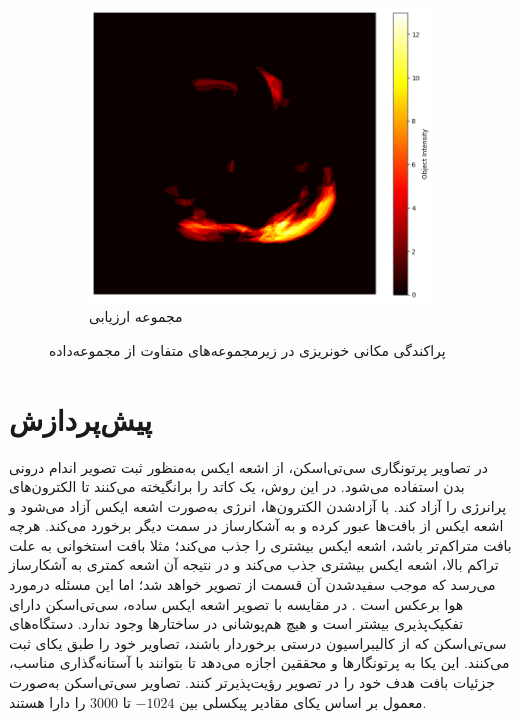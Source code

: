 \begin{figure}[h!]
    \begin{subfigure}{0.33\textwidth}
        \includegraphics[width=\linewidth]{Images/chapter2/test_heatmap.png}
        \caption{مجموعه ارزیابی}
        \label{fig:test}
    \end{subfigure}

    \caption{پراکندگی مکانی خونریزی در زیرمجموعه‌های متفاوت از مجموعه‌داده}
    \label{fig:heatmaps}
\end{figure}


\section{پیش‌پردازش\protect{}}

در تصاویر پرتونگاری سی‌تی‌اسکن، از اشعه ایکس
 به‌منظور ثبت تصویر اندام درونی بدن استفاده می‌شود. در این روش، ‌یک کاتد
را برانگیخته می‌کنند تا الکترون‌های
 پرانرژی را آزاد ‌کند. با آزادشدن الکترون‌ها، انرژی به‌صورت اشعه ایکس آزاد می‌شود و اشعه ایکس از بافت‌ها عبور کرده و به آشکارساز در سمت دیگر برخورد می‌کند. هرچه بافت متراکم‌تر باشد، اشعه ایکس بیشتری را جذب می‌کند؛ مثلا بافت استخوانی به علت تراکم بالا،‌ اشعه ایکس بیشتری جذب می‌کند و در نتیجه آن اشعه کمتری به آشکارساز می‌رسد که موجب سفیدشدن آن قسمت از تصویر خواهد شد؛ اما این مسئله درمورد هوا برعکس است
 \cite{kaggleCTScansDICOM}.
در مقایسه با تصویر اشعه ایکس ساده، سی‌تی‌اسکن دارای تفکیک‌پذیری بیشتر است و هیچ هم‌پوشانی در ساختارها وجود ندارد.
دستگاه‌های سی‌تی‌اسکن که از کالیبراسیون
 درستی برخوردار باشند، تصاویر خود را طبق یکای 
ثبت می‌کنند. این یکا به پرتونگارها و محققین اجازه می‌دهد تا بتوانند با آستانه‌گذاری مناسب، جزئیات بافت هدف خود را در تصویر رؤیت‌پذیرتر کنند. تصاویر سی‌تی‌اسکن به‌صورت معمول بر اساس یکای
 مقادیر پیکسلی بین $-1024$ تا $3000$ را دارا هستند.

